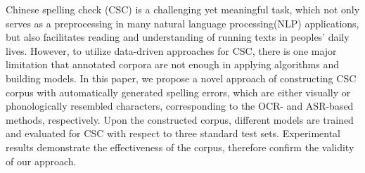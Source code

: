 Chinese spelling check (CSC) is a challenging yet meaningful task, which not only serves as a preprocessing in many natural language processing(NLP) applications, but also facilitates reading and understanding of running texts in peoples' daily lives. However, to utilize data-driven approaches for CSC, there is one major limitation that annotated corpora are not enough in applying algorithms and building models. In this paper, we propose a novel approach of constructing CSC corpus with automatically generated spelling errors, which are either visually or phonologically resembled characters, corresponding to the OCR- and ASR-based methods, respectively. Upon the constructed corpus, different models are trained and evaluated for CSC with respect to three standard test sets. Experimental results demonstrate the effectiveness of the corpus, therefore confirm the validity of our approach.
